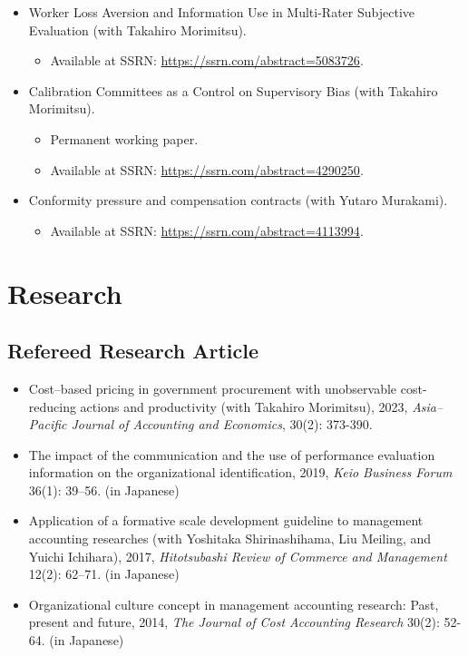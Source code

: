 \documentclass[letterpaper,11pt]{article}
\begin{document}
\begin{itemize}
    \item Worker Loss Aversion and Information Use in Multi-Rater Subjective Evaluation (with Takahiro Morimitsu).
        \begin{itemize}
            \item Available at SSRN: \url{https://ssrn.com/abstract=5083726}.
        \end{itemize}

    \item Calibration Committees as a Control on Supervisory Bias (with Takahiro Morimitsu).
        \begin{itemize}
            \item Permanent working paper.
            \item Available at SSRN: \url{https://ssrn.com/abstract=4290250}.
        \end{itemize}

    \item Conformity pressure and compensation contracts (with Yutaro Murakami).
        \begin{itemize}
            \item Available at SSRN: \url{https://ssrn.com/abstract=4113994}.
        \end{itemize}
\end{itemize}

\section*{Research}

\subsection*{Refereed Research Article}

\begin{itemize}
    \item Cost--based pricing in government procurement with unobservable cost-reducing actions and productivity (with Takahiro Morimitsu), 2023, \textit{Asia--Pacific Journal of Accounting and Economics}, 30(2): 373-390.

    \item The impact of the communication and the use of performance evaluation information on the organizational identification, 2019, \textit{Keio Business Forum} 36(1): 39--56. (in Japanese)

	\item Application of a formative scale development guideline to management accounting researches (with Yoshitaka Shirinashihama, Liu Meiling, and Yuichi Ichihara), 2017, \textit{Hitotsubashi Review of Commerce and Management} 12(2): 62--71. (in Japanese)

	\item Organizational culture concept in management accounting research: Past, present and future, 2014, \textit{The Journal of Cost Accounting Research} 30(2): 52-64. (in Japanese)
\end{itemize}
\end{document}
